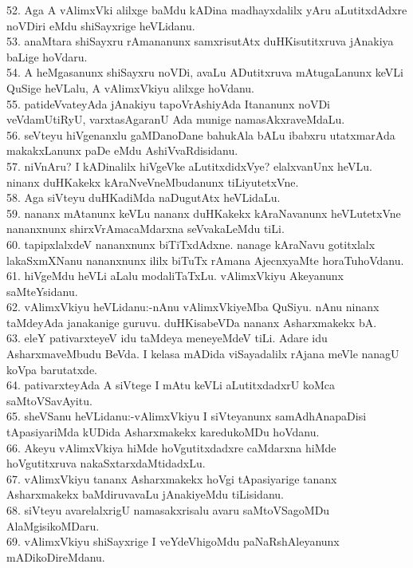 \documentclass{article}
\begin{document}
52. Aga A vAlimxVki alilxge baMdu kADina madhayxdalilx yAru aLutitxdAdxre noVDiri eMdu shiSayxrige heVLidanu.\\
53. anaMtara shiSayxru rAmananunx samxrisutAtx duHKisutitxruva jAnakiya baLige hoVdaru.\\
54. A heMgasanunx shiSayxru noVDi, avaLu ADutitxruva mAtugaLanunx keVLi QuSige heVLalu, A vAlimxVkiyu alilxge hoVdanu.\\
55. patideVvateyAda jAnakiyu tapoVrAshiyAda Itananunx noVDi veVdamUtiRyU, varxtasAgaranU Ada munige namasAkxraveMdaLu.\\
56. seVteyu hiVgenanxlu gaMDanoDane bahukAla bALu ibabxru utatxmarAda makakxLanunx paDe eMdu AshiVvaRdisidanu.\\
57. niVnAru? I kADinalilx hiVgeVke aLutitxdidxVye? elalxvanUnx heVLu. ninanx duHKakekx kAraNveVneMbudanunx tiLiyutetxVne.\\
58. Aga siVteyu duHKadiMda naDugutAtx heVLidaLu.\\
59. nananx mAtanunx keVLu nananx duHKakekx kAraNavanunx heVLutetxVne nananxnunx shirxVrAmacaMdarxna seVvakaLeMdu tiLi.\\
60. tapipxlalxdeV nananxnunx biTiTxdAdxne. nanage kAraNavu gotitxlalx lakaSxmXNanu nananxnunx ililx biTuTx rAmana AjecnxyaMte horaTuhoVdanu.\\
61. hiVgeMdu heVLi aLalu modaliTaTxLu. vAlimxVkiyu Akeyanunx saMteYsidanu.\\
62. vAlimxVkiyu heVLidanu:-nAnu vAlimxVkiyeMba QuSiyu. nAnu ninanx taMdeyAda janakanige guruvu. duHKisabeVDa nananx Asharxmakekx bA.\\
63. eleY pativarxteyeV idu taMdeya meneyeMdeV tiLi. Adare idu AsharxmaveMbudu BeVda. I kelasa mADida viSayadalilx rAjana meVle nanagU koVpa barutatxde.\\
64. pativarxteyAda A siVtege I mAtu keVLi aLutitxdadxrU koMca saMtoVSavAyitu.\\
65. sheVSanu heVLidanu:-vAlimxVkiyu I siVteyanunx samAdhAnapaDisi tApasiyariMda kUDida Asharxmakekx karedukoMDu hoVdanu.\\
66. Akeyu vAlimxVkiya hiMde hoVgutitxdadxre caMdarxna hiMde hoVgutitxruva nakaSxtarxdaMtidadxLu.\\
67. vAlimxVkiyu tananx Asharxmakekx hoVgi tApasiyarige tananx Asharxmakekx baMdiruvavaLu jAnakiyeMdu tiLisidanu.\\
68. siVteyu avarelalxrigU namasakxrisalu avaru saMtoVSagoMDu AlaMgisikoMDaru.\\
69. vAlimxVkiyu shiSayxrige I veYdeVhigoMdu paNaRshAleyanunx mADikoDireMdanu.\\
\end{document}
